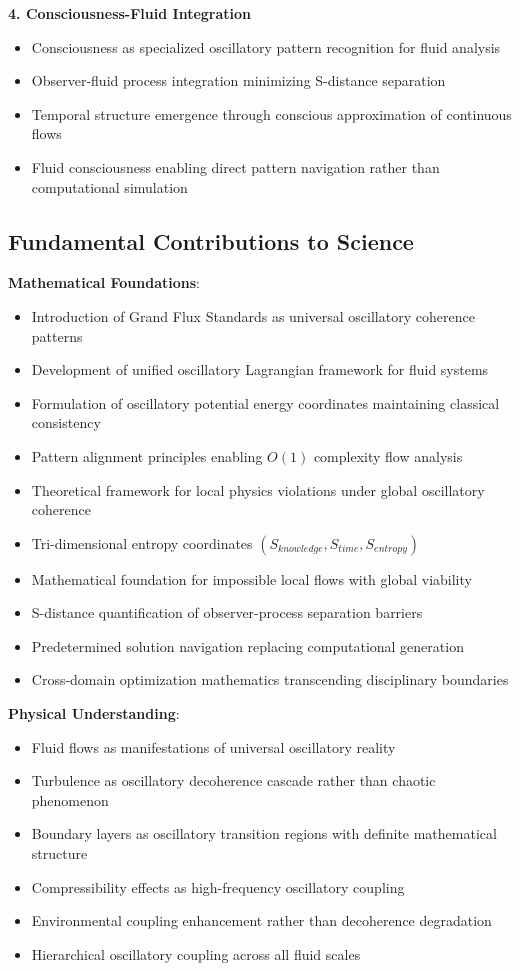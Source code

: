 \documentclass[12pt,a4paper]{article}
\begin{document}
\textbf{4. Consciousness-Fluid Integration}
\begin{itemize}
\item Consciousness as specialized oscillatory pattern recognition for fluid analysis
\item Observer-fluid process integration minimizing S-distance separation
\item Temporal structure emergence through conscious approximation of continuous flows
\item Fluid consciousness enabling direct pattern navigation rather than computational simulation
\end{itemize}

\subsection{Fundamental Contributions to Science}

\textbf{Mathematical Foundations}:
\begin{itemize}
\item Introduction of Grand Flux Standards as universal oscillatory coherence patterns
\item Development of unified oscillatory Lagrangian framework for fluid systems
\item Formulation of oscillatory potential energy coordinates maintaining classical consistency
\item Pattern alignment principles enabling $O(1)$ complexity flow analysis
\item Theoretical framework for local physics violations under global oscillatory coherence
\item Tri-dimensional entropy coordinates $(S_{knowledge}, S_{time}, S_{entropy})$
\item Mathematical foundation for impossible local flows with global viability
\item S-distance quantification of observer-process separation barriers
\item Predetermined solution navigation replacing computational generation
\item Cross-domain optimization mathematics transcending disciplinary boundaries
\end{itemize}

\textbf{Physical Understanding}:
\begin{itemize}
\item Fluid flows as manifestations of universal oscillatory reality
\item Turbulence as oscillatory decoherence cascade rather than chaotic phenomenon
\item Boundary layers as oscillatory transition regions with definite mathematical structure
\item Compressibility effects as high-frequency oscillatory coupling
\item Environmental coupling enhancement rather than decoherence degradation
\item Hierarchical oscillatory coupling across all fluid scales
\end{itemize}
\end{document}
